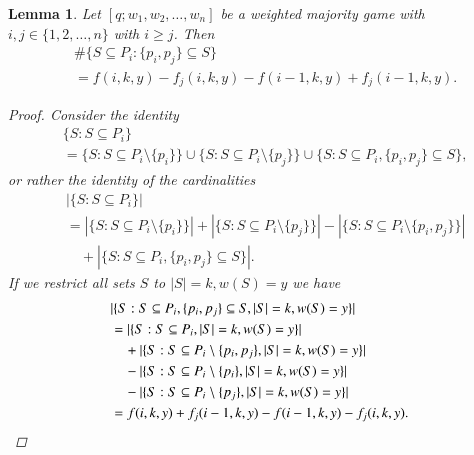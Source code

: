 \documentclass[review]{elsarticle}
\newtheorem{lem}[thm]{Lemma}
\theoremstyle{defn}
\theoremstyle{Pseudo-Code}
\begin{document}
\begin{lem}
\label{lem:pipj}
Let $[q;w_1,w_2,\dots,w_n]$ be a weighted majority game with $i,j\in\{1,2,\dots,n\}$ with $i \geq j$. Then
\begin{align*}
 &\#\{S\subseteq P_i: \{p_i,p_j\}\subseteq S \}
\\ 
 &=
   f(i,k,y)
  -  
   f_j(i,k,y)
  -
  f(i-1,k,y)
  +
  f_j(i-1,k,y)  
  .
\end{align*}
\begin{proof}
Consider the identity
\begin{align*}
  &\{S:S\subseteq P_i\}
\\  
  &=
  \{S:S\subseteq P_i\setminus \{p_i\}\}
  \cup
  \{S:S\subseteq P_i\setminus \{p_j\}\}
  \cup
  \{S:S\subseteq P_i,\{p_i,p_j\}\subseteq S \},  
\end{align*}
or rather the identity of the cardinalities
\begin{align*}
  &|\{S:S\subseteq P_i\}|
\\  
  &=
  |\{S:S\subseteq P_i\setminus \{p_i\}\}|
  +
  |\{S:S\subseteq P_i\setminus \{p_j\}\}|
  -
  |\{S:S\subseteq P_i\setminus \{p_i,p_j\}\}|  
\\  
  &\quad   
  + 
  |\{S:S\subseteq P_i,\{p_i,p_j\}\subseteq S \} |
  .
\end{align*}
If we restrict all sets $S$ to $|S|=k, w(S)=y$ we have
\begin{align*}
 &|\{S:S\subseteq P_i, \{p_i,p_j\}\subseteq S, |S|=k, w(S)=y \} |
\\ 
  &=
  |\{S:S\subseteq P_i, |S|=k, w(S)=y\}|
\\  
  &\quad 
  +
  |\{S:S\subseteq P_i\setminus \{p_i,p_j\}, |S|=k, w(S)=y\}|
\\  
  &\quad 
  -
  |\{S:S\subseteq P_i\setminus \{p_i\}, |S|=k, w(S)=y\}|
\\  
  &\quad   
  -
  |\{S:S\subseteq P_i\setminus \{p_j\}, |S|=k, w(S)=y\}|  
\\
  &= 
  f(i,k,y)
  +
  f_j(i-1,k,y) 
  -
  f(i-1,k,y)
  -  
  f_j(i,k,y)
.
\qedhere
\end{align*}
\end{proof}

\end{lem}
\end{document}

